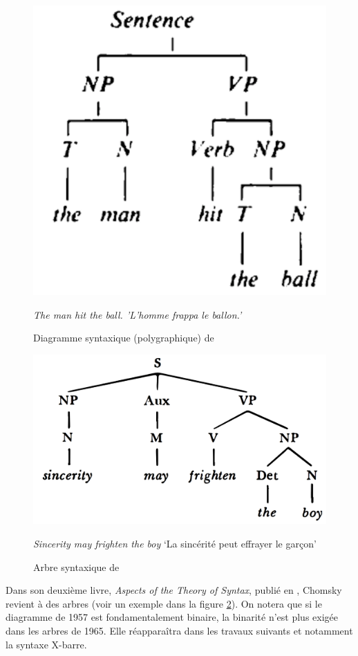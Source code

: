 {\begin{figure}
    \centering
    \includegraphics[width=\textwidth]{figures/vol1syntaxe2-img026.png}
    \caption{Diagramme syntaxique (polygraphique) de \citet{chomsky1957syntactic}}
    \textit{The man hit the ball. 'L'homme frappa le ballon.’}
    \label{fig:chomsky57}
\end{figure}

\begin{figure}
    \centering
    \includegraphics[width=\textwidth]{figures/vol1syntaxe2-img027.png}
    \caption{Arbre syntaxique de \citet{chomsky1965aspects}}
   \textit{Sincerity may frighten the boy} ‘La sincérité peut effrayer le garçon’ 
    \label{fig:chomsky65}
\end{figure}




    Dans son deuxième livre, \textit{Aspects of the Theory of Syntax}, publié en \citeyear{chomsky1965aspects}, Chomsky revient à des arbres (voir un exemple dans la figure \ref{fig:chomsky65}). On notera que si le diagramme de 1957 est fondamentalement binaire, la binarité n’est plus exigée dans les arbres de 1965. Elle réapparaîtra dans les travaux suivants et notamment la syntaxe X-barre.
}
